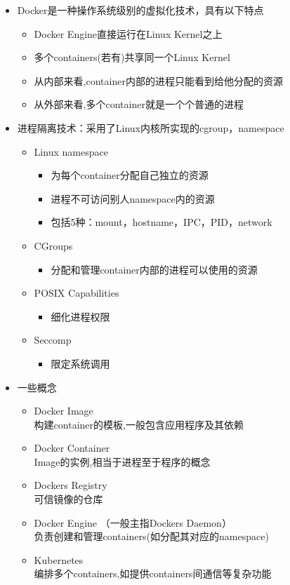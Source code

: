 \documentclass[AutoFakeBold,a4paper]{ctexart}
\begin{document}
\begin{itemize}
    \item Docker是一种操作系统级别的虚拟化技术，具有以下特点
    \begin{itemize}
        \item Docker Engine直接运行在Linux Kernel之上
        \item 多个containers(若有)共享同一个Linux Kernel
        \item 从内部来看,container内部的进程只能看到给他分配的资源
        \item 从外部来看,多个container就是一个个普通的进程
    \end{itemize}
    \item 进程隔离技术：采用了Linux内核所实现的cgroup，namespace
    \begin{itemize}
        \item Linux namespace
        \begin{itemize}
            \item 为每个container分配自己独立的资源
            \item 进程不可访问别人namespace内的资源
            \item 包括5种：mount，hostname，IPC，PID，network
        \end{itemize}
        \item CGroups
        \begin{itemize}
            \item 分配和管理container内部的进程可以使用的资源
        \end{itemize}
        \item POSIX Capabilities
        \begin{itemize}
            \item 细化进程权限
        \end{itemize}
        \item Seccomp
        \begin{itemize}
            \item 限定系统调用
        \end{itemize}
    \end{itemize}
    \item 一些概念
    \begin{itemize}
        \item Docker Image\\
        构建container的模板,一般包含应用程序及其依赖
        \item Docker Container\\
        Image的实例,相当于进程至于程序的概念
        \item Dockers Registry\\
        可信镜像的仓库
        \item Docker Engine （一般主指Dockers Daemon）\\
        负责创建和管理containers(如分配其对应的namespace)
        \item Kubernetes\\
        编排多个containers,如提供containers间通信等复杂功能
    \end{itemize}
\end{itemize}
\end{document}
